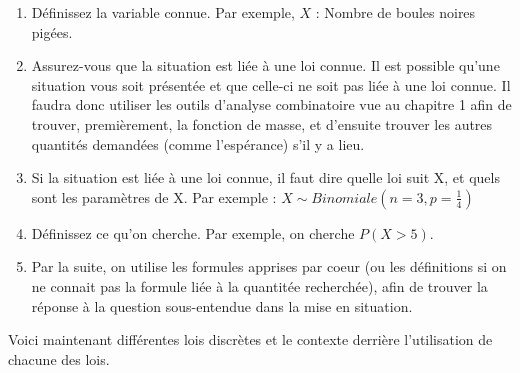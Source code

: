 \documentclass[10pt, french]{article}
\begin{document}
\begin{multicols*}{2}
\begin{definitionNOHFILL}
\begin{enumerate}
\item Définissez la variable connue. Par exemple, $X$ : Nombre de boules noires pigées. 
\item Assurez-vous que la situation est liée à une loi connue. Il est possible qu'une situation vous soit présentée et que celle-ci ne soit pas liée à une loi connue. Il faudra donc utiliser les outils d'analyse combinatoire vue au chapitre 1 afin de trouver, premièrement, la fonction de masse, et d'ensuite trouver les autres quantités demandées (comme l'espérance) s'il y a lieu.
\item Si la situation est liée à une loi connue, il faut dire quelle loi suit X, et quels sont les paramètres de X. Par exemple : $X \sim Binomiale(n = 3, p = \frac{1}{4})$
\item Définissez ce qu'on cherche. Par exemple, on cherche $P(X > 5)$.
\item Par la suite, on utilise les formules apprises par coeur (ou les définitions si on ne connait pas la formule liée à la quantitée recherchée), afin de trouver la réponse à la question sous-entendue dans la mise en situation.
\end{enumerate}
\end{definitionNOHFILL}

Voici maintenant différentes lois discrètes et le contexte derrière l'utilisation de chacune des lois.


\end{multicols*}
\end{document}

